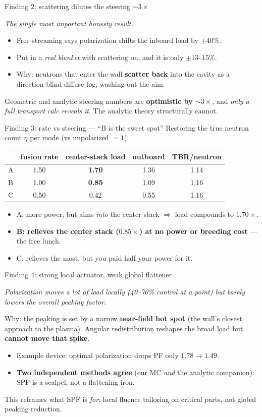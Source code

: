 \documentclass[11pt,aspectratio=169]{beamer}
\newcommand{\key}[1]{\textcolor{key}{\textbf{#1}}}
\newcommand{\qq}[1]{\begin{center}\emph{#1}\end{center}}
\begin{document}
\begin{frame}{Finding 2: scattering dilutes the steering $\sim 3\times$}
\qq{The single most important honesty result.}
\begin{itemize}
\item Free-streaming says polarization shifts the inboard load by $\pm 40\%$.
\item Put in a \emph{real blanket} with scattering on, and it is only $\pm 13$--$15\%$.
\item Why: neutrons that enter the wall \key{scatter back} into the cavity as a
direction-blind diffuse fog, washing out the aim.
\end{itemize}
Geometric and analytic steering numbers are \key{optimistic by $\sim\!3\times$}, and
\emph{only a full transport calc reveals it}. The analytic theory structurally cannot.
\end{frame}

\begin{frame}{Finding 3: rate vs steering --- ``B is the sweet spot''}
Restoring the true neutron count $\eta$ per mode (vs unpolarized $=1$):
\begin{center}\small
\begin{tabular}{lcccc}
& fusion rate & center-stack load & outboard & TBR/neutron\\\hline
A & 1.50 & \key{1.70} & 1.36 & 1.14\\
B & 1.00 & \key{0.85} & 1.09 & 1.16\\
C & 0.50 & 0.42 & 0.55 & 1.16\\
\end{tabular}
\end{center}
\begin{itemize}
\item A: more power, but aims \emph{into} the center stack $\Rightarrow$ load compounds to
$1.70\times$.
\item \key{B: relieves the center stack ($0.85\times$) at no power or breeding cost} --- the
free lunch.
\item C: relieves the most, but you paid half your power for it.
\end{itemize}
\end{frame}

\begin{frame}{Finding 4: strong local actuator, weak global flattener}
\qq{Polarization moves a lot of load \emph{locally} (40--70\% control at a point) but barely
lowers the overall \emph{peaking factor}.}
Why: the peaking is set by a narrow \key{near-field hot spot} (the wall's closest approach to
the plasma). Angular redistribution reshapes the broad load but \key{cannot move that spike}.
\begin{itemize}
\item Example device: optimal polarization drops PF only $1.78\to1.49$.
\item \key{Two independent methods agree} (our MC \emph{and} the analytic companion): SPF is a
scalpel, not a flattening iron.
\end{itemize}
This reframes what SPF is \emph{for}: local fluence tailoring on critical parts, not global
peaking reduction.
\end{frame}
\end{document}
